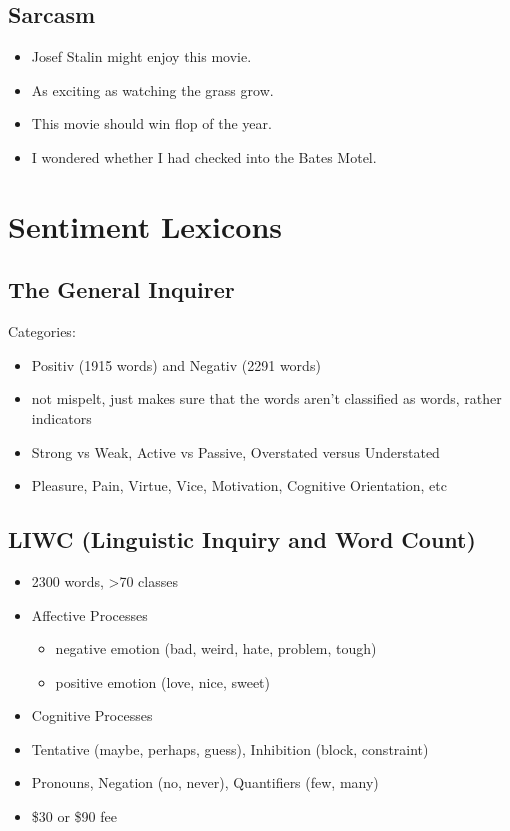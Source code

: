 \documentclass[11pt]{article}
\theoremstyle{definition}
\begin{document}
\subsection{Sarcasm}
\begin{itemize}
  \item Josef Stalin might enjoy this movie.
  \item As exciting as watching the grass grow.
  \item This movie should win flop of the year.
  \item I wondered whether I had checked into the Bates Motel.
\end{itemize}

\section{Sentiment Lexicons}
\subsection{The General Inquirer}
Categories:

\begin{itemize}
  \item Positiv (1915 words) and Negativ (2291 words)
  \item not mispelt, just makes sure that the words aren't classified as words, rather indicators
  \item Strong vs Weak, Active vs Passive, Overstated versus Understated
  \item Pleasure, Pain, Virtue, Vice, Motivation, Cognitive Orientation, etc
\end{itemize}

\subsection{LIWC (Linguistic Inquiry and Word Count)}
\begin{itemize}
  \item 2300 words, >70 classes
  \item Affective Processes
  \begin{itemize}
    \item negative emotion (bad, weird, hate, problem, tough)
    \item positive emotion (love, nice, sweet)
  \end{itemize}
  \item Cognitive Processes
  \item Tentative (maybe, perhaps, guess), Inhibition (block, constraint)
  \item Pronouns, Negation (no, never), Quantifiers (few, many)
  \item \$30 or \$90 fee
\end{itemize}
\end{document}
